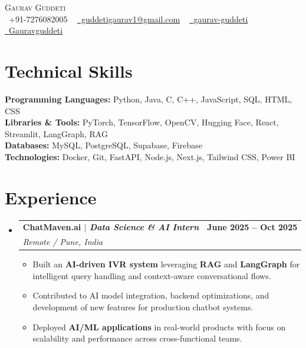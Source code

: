 \documentclass[letterpaper,10pt]{article}
\makeatletter
\newcommand{\resumeItem}[1]{
  \item\small{
    {#1 \vspace{-2pt}}
  }
}
\newcommand{\resumeSubheading}[4]{
  \vspace{-2pt}\item
    \begin{tabular*}{1.0\textwidth}[t]{l@{\extracolsep{\fill}}r}
      \textbf{#1} & \textbf{\small #2} \\
      \textit{\small#3} & \textit{\small #4} \\
    \end{tabular*}\vspace{-7pt}
}
\newcommand{\resumeSubHeadingListStart}{\begin{itemize}[leftmargin=0.0in, label={}]}
\newcommand{\resumeSubHeadingListEnd}{\end{itemize}}
\newcommand{\resumeItemListStart}{\begin{itemize}[leftmargin=0.15in]}
\newcommand{\resumeItemListEnd}{\end{itemize}\vspace{-5pt}}
\makeatother
\begin{document}
\begin{center}
    {\Huge \scshape Gaurav Guddeti} \\ \vspace{1pt}
    \small
    \raisebox{-0.1\height}\faPhone\ +91-7276082005 ~
    \href{mailto:guddetigaurav1@gmail.com}{\raisebox{-0.2\height}\faEnvelope\ guddetigaurav1@gmail.com} ~
    \href{https://linkedin.com/in/gaurav-guddeti-a2359827b}{\raisebox{-0.2\height}\faLinkedin\ gaurav-guddeti} ~
    \href{https://github.com/Gauravguddeti}{\raisebox{-0.2\height}\faGithub\ Gauravguddeti}
    \vspace{-8pt}
\end{center}

\section{Technical Skills}
 \begin{itemize}[leftmargin=0.15in, label={}]
    \small{\item{
     \textbf{Programming Languages:}{ Python, Java, C, C++, JavaScript, SQL, HTML, CSS} \\
     \textbf{Libraries \& Tools:}{ PyTorch, TensorFlow, OpenCV, Hugging Face, React, Streamlit, LangGraph, RAG} \\
     \textbf{Databases:}{ MySQL, PostgreSQL, Supabase, Firebase} \\
     \textbf{Technologies:}{ Docker, Git, FastAPI, Node.js, Next.js, Tailwind CSS, Power BI}
    }}
 \end{itemize}
 \vspace{-16pt}

\section{Experience}
  \resumeSubHeadingListStart
    \resumeSubheading
      {ChatMaven.ai $|$ \emph{Data Science \& AI Intern}}{June 2025 -- Oct 2025}
      {Remote / Pune, India}{}
      \resumeItemListStart
        \resumeItem{Built an \textbf{AI-driven IVR system} leveraging \textbf{RAG} and \textbf{LangGraph} for intelligent query handling and context-aware conversational flows.}
        \resumeItem{Contributed to AI model integration, backend optimizations, and development of new features for production chatbot systems.}
        \resumeItem{Deployed \textbf{AI/ML applications} in real-world products with focus on scalability and performance across cross-functional teams.}
      \resumeItemListEnd
  \resumeSubHeadingListEnd
\vspace{-16pt}
\end{document}
